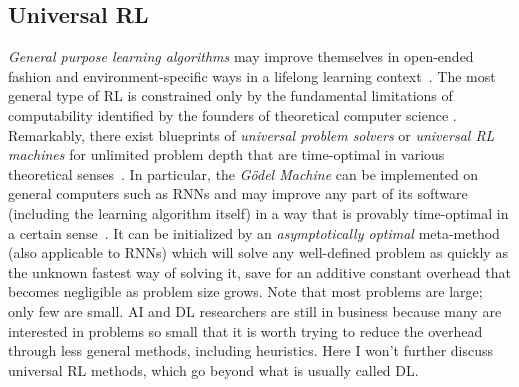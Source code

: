 \documentclass[letterpaper]{article}
\begin{document}
\begin{CJK*}{UTF8}{gbsn}
\subsection{Universal RL}
\label{unirl}


{\em General purpose learning algorithms}
may improve themselves in open-ended fashion
and environment-specific 
ways in a lifelong learning 
context~\citep{schmidhuber87,Schmidhuber:97bias,Schmidhuber:97ssa,scholarpedia2010}. 
The most general type of RL is constrained only by the
fundamental limitations of computability identified by 
the founders of theoretical computer science 
\citep{Goedel:31,Church:36,Turing:36,Post:36}.
Remarkably, there exist blueprints of
 {\em universal problem solvers} or {\em universal RL machines}
for unlimited problem depth 
that are  
time-optimal in various theoretical senses~\citep{Hutter:05book+,Hutter:01fast+,Schmidhuber:02colt,Schmidhuber:05gmai}. 
In particular, the {\em G\"{o}del Machine} can be implemented 
on general computers such as RNNs and may improve 
any part of its software (including the learning algorithm itself)  
in a way that is provably time-optimal in a certain sense~\citep{Schmidhuber:05gmai}. It can be initialized by an 
{\em asymptotically optimal}
meta-method~\citep{Hutter:01fast+} (also applicable to RNNs)
which will solve any well-defined problem as quickly as the unknown fastest way of solving it, save for an additive constant overhead that becomes negligible as problem size grows. Note that most problems are large; only few are small. AI and DL researchers are still in business because many are interested in problems so small that it is worth trying to reduce the overhead through less general methods, including heuristics. Here I won't further discuss universal RL methods, which go beyond what is usually called DL. 



%
%
%
%
%
\end{CJK*}
\end{document}
